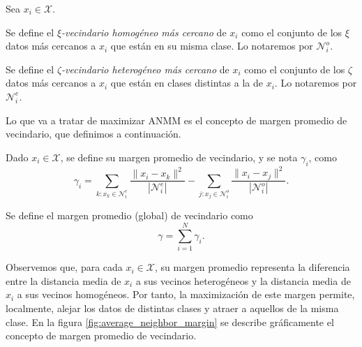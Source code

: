 \begin{definition}
    Sea $x_i \in \mathcal{X}$.
    
    Se define el \emph{$\xi$-vecindario homogéneo más cercano} de $x_i$ como el conjunto de los $\xi$ datos más cercanos a $x_i$ que están en su misma clase. Lo notaremos por $\mathcal{N}_i^o$.
    
    Se define el \emph{$\zeta$-vecindario heterogéneo más cercano} de $x_i$ como el conjunto de los $\zeta$ datos más cercanos a $x_i$ que están en clases distintas a la de $x_i$. Lo notaremos por $\mathcal{N}_i^e$.
\end{definition} 

Lo que va a tratar de maximizar ANMM es el concepto de margen promedio de vecindario, que definimos a continuación.

\begin{definition}
    Dado $x_i \in \mathcal{X}$, se define su margen promedio de vecindario, y se nota $\gamma_i$, como
    \begin{equation}
        \gamma_i = \sum\limits_{k \colon x_k \in \mathcal{N}_i^e} \frac{\|x_i - x_k \|^2}{|\mathcal{N}_i^e|} - \sum\limits_{j \colon x_j \in \mathcal{N}_i^o} \frac{\|x_i - x_j \|^2}{|\mathcal{N}_i^o|}.
    \end{equation}
    
    Se define el margen promedio (global) de vecindario como
    \begin{equation}
        \gamma = \sum_{i=1}^N \gamma_i.
    \end{equation}

    
\end{definition}

Observemos que, para cada $x_i \in \mathcal{X}$, su margen promedio representa la diferencia entre la distancia media de $x_i$ a sus vecinos heterogéneos y la distancia media de $x_i$ a sus vecinos homogéneos. Por tanto, la maximización de este margen permite, localmente, alejar los datos de distintas clases y atraer a aquellos de la misma clase. En la figura \ref{fig:average_neighbor_margin} se describe gráficamente el concepto de margen promedio de vecindario.

